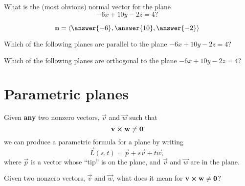 \documentclass{ximera}
\begin{document}
\begin{question}
  What is the (most obvious) normal vector for the plane
  \[
  -6x+10y-2z = 4?
  \]
  \begin{prompt}
    \[
    \vec{n} = \vector{\answer{-6},\answer{10},\answer{-2}}
    \]
  \end{prompt}
  \begin{question}
    Which of the following planes are parallel to the plane $-6x+10y-2z = 4$?
    \begin{selectAll}
    \end{selectAll}
      \begin{question}
    Which of the following planes are orthogonal to the plane $-6x+10y-2z = 4$?
    \begin{selectAll}
    \end{selectAll}
  \end{question}
  \end{question}
\end{question}


\section{Parametric planes}


Given \textbf{any} two nonzero vectors, $\vec{v}$ and $\vec{w}$ such that
\[
\mathbf{v}\boldsymbol\times \mathbf{w} \ne \mathbf{0}
\]
we can produce a parametric formula for a plane by writing
\[
\vec{L}(s,t) = \vec{p} + s\vec{v} + t\vec{w},
\]
where $\vec{p}$ is a vector whose ``tip'' is on the plane, and
$\vec{v}$ and $\vec{w}$ are in the plane.
\begin{question}
  Given two nonzero vectors, $\vec{v}$ and $\vec{w}$, what does it
  mean for $\mathbf{v}\boldsymbol\times \mathbf{w} \ne \mathbf{0}$?
  \begin{prompt}
    \begin{multipleChoice}
    \end{multipleChoice}
  \end{prompt}
\end{question}
\end{document}
